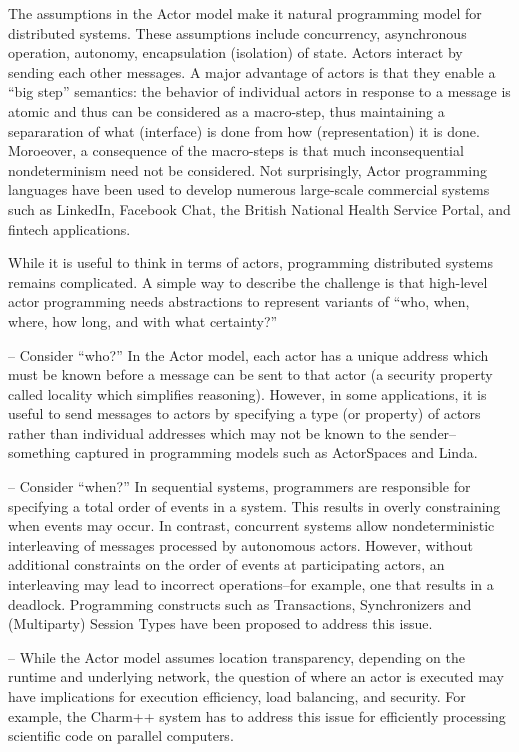 The assumptions in the Actor model make it natural programming model
for distributed systems.  These assumptions include concurrency,
asynchronous operation, autonomy, encapsulation (isolation) of state.
Actors interact by sending each other messages.  A major advantage of
actors is that they enable a ``big step'' semantics: the behavior of
individual actors in response to a message is atomic and thus can be
considered as a macro-step, thus maintaining a separaration of what
(interface) is done from how (representation) it is done.  Moroeover,
a consequence of the macro-steps is that much inconsequential
nondeterminism need not be considered.  Not surprisingly, Actor
programming languages have been used to develop numerous large-scale
commercial systems such as LinkedIn, Facebook Chat, the British
National Health Service Portal, and fintech applications.

While it is useful to think in terms of actors, programming
distributed systems remains complicated.  A simple way to describe the
challenge is that high-level actor programming needs abstractions to
represent variants of ``who, when, where, how long, and with what
certainty?''

-- Consider ``who?''  In the Actor model, each actor has a unique
address which must be known before a message can be sent to that actor
(a security property called locality which simplifies reasoning).
However, in some applications, it is useful to send messages to actors
by specifying a type (or property) of actors rather than individual
addresses which may not be known to the sender--something captured in
programming models such as ActorSpaces and Linda.

-- Consider ``when?''  In sequential systems, programmers are
responsible for specifying a total order of events in a system.  This
results in overly constraining when events may occur.  In contrast,
concurrent systems allow nondeterministic interleaving of messages
processed by autonomous actors.  However, without additional
constraints on the order of events at participating actors, an
interleaving may lead to incorrect operations--for example, one that
results in a deadlock.  Programming constructs such as Transactions,
Synchronizers and (Multiparty) Session Types have been proposed to
address this issue.

-- While the Actor model assumes location transparency, depending on
the runtime and underlying network, the question of where an actor is
executed may have implications for execution efficiency, load
balancing, and security.  For example, the Charm++ system has to
address this issue for efficiently processing scientific code on
parallel computers.


